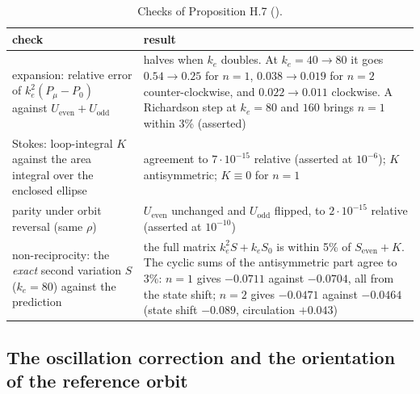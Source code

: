 
\begin{table}[htbp]
\centering
\small
\caption[Checks of Proposition H.7]{Checks of Proposition H.7 ().}
\label{tab:finitegain:checks}
\begin{tabularx}{\textwidth}{@{}>{\raggedright\arraybackslash}p{}Y@{}}
\toprule
check & result \\
\midrule
expansion: relative error of $k_e^2(P_\mu - P_0)$ against $U_{\mathrm{even}}+U_{\mathrm{odd}}$
  & halves when $k_e$ doubles. At $k_e = 40\to80$ it goes $0.54\to0.25$ for $n=1$, $0.038\to0.019$ for $n=2$
    counter-clockwise, and $0.022\to0.011$ clockwise. A Richardson step at $k_e=80$ and $160$ brings $n=1$ within
    3\% (asserted) \\
\addlinespace
Stokes: loop-integral $K$ against the area integral over the enclosed ellipse
  & agreement to $7\cdot10^{-15}$ relative (asserted at $10^{-6}$); $K$ antisymmetric; $K\equiv0$ for $n=1$ \\
\addlinespace
parity under orbit reversal (same $\rho$)
  & $U_{\mathrm{even}}$ unchanged and $U_{\mathrm{odd}}$ flipped, to $2\cdot10^{-15}$ relative (asserted at
    $10^{-10}$) \\
\addlinespace
non-reciprocity: the \emph{exact} second variation $S$ ($k_e=80$) against the prediction
  & the full matrix $k_e^2S + k_eS_0$ is within 5\% of $S_{\mathrm{even}}+K$. The cyclic sums of the antisymmetric
    part agree to 3\%: $n=1$ gives $-0.0711$ against $-0.0704$, all from the state shift; $n=2$ gives $-0.0471$
    against $-0.0464$ (state shift $-0.089$, circulation $+0.043$) \\
\bottomrule
\end{tabularx}
\end{table}

\subsection{The oscillation correction and the orientation of the reference orbit}

